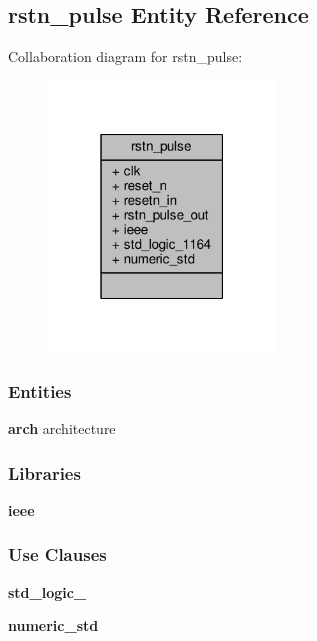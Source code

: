 \subsection{rstn\+\_\+pulse Entity Reference}
\label{classrstn__pulse}


Collaboration diagram for rstn\+\_\+pulse\+:\nopagebreak
\begin{figure}[H]
\begin{center}
\leavevmode
\includegraphics[width=171pt]{d3/d8c/classrstn__pulse__coll__graph}
\end{center}
\end{figure}
\subsubsection*{Entities}
\begin{DoxyCompactItemize}
\item 
{\bf arch} architecture
\end{DoxyCompactItemize}
\subsubsection*{Libraries}
 \begin{DoxyCompactItemize}
\item 
{\bf ieee} 
\end{DoxyCompactItemize}
\subsubsection*{Use Clauses}
 \begin{DoxyCompactItemize}
\item 
{\bf std\+\_\+logic\+\_}   
\item 
{\bf numeric\+\_\+std}   
\end{DoxyCompactItemize}
